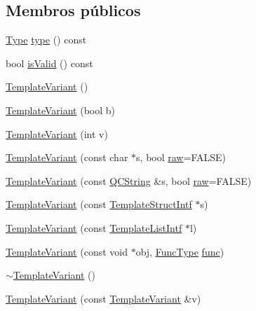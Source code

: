 \subsection*{Membros públicos}
\begin{DoxyCompactItemize}
\item 
\hyperlink{class_template_variant_a1d1cfd8ffb84e947f82999c682b666a7}{Type} \hyperlink{class_template_variant_abca1428e063147be90f3f5bd61988e84}{type} () const 
\item 
bool \hyperlink{class_template_variant_aac1b70a2ed67ead038c4d3f5ac4d8a81}{is\-Valid} () const 
\item 
\hyperlink{class_template_variant_ac0e47db8dd7250c313aa8df93ef88cd2}{Template\-Variant} ()
\item 
\hyperlink{class_template_variant_a13ff765310f43b911a2a9482df3ee834}{Template\-Variant} (bool b)
\item 
\hyperlink{class_template_variant_a8f05eae95886cc47c804212603c13cb2}{Template\-Variant} (int v)
\item 
\hyperlink{class_template_variant_a76ffcb0a0e88f62c0469c6568c685df3}{Template\-Variant} (const char $\ast$s, bool \hyperlink{class_template_variant_a4b1f81e659f9eb2d4964f1b3e55a32bb}{raw}=F\-A\-L\-S\-E)
\item 
\hyperlink{class_template_variant_a36208d2d2b65db39f94949efca59ad4e}{Template\-Variant} (const \hyperlink{class_q_c_string}{Q\-C\-String} \&s, bool \hyperlink{class_template_variant_a4b1f81e659f9eb2d4964f1b3e55a32bb}{raw}=F\-A\-L\-S\-E)
\item 
\hyperlink{class_template_variant_a87fc0fc43724dbcc478add94f6a06d15}{Template\-Variant} (const \hyperlink{class_template_struct_intf}{Template\-Struct\-Intf} $\ast$s)
\item 
\hyperlink{class_template_variant_aa00eac4f737f777af03d16c58339c79c}{Template\-Variant} (const \hyperlink{class_template_list_intf}{Template\-List\-Intf} $\ast$l)
\item 
\hyperlink{class_template_variant_a2a1090689531710f7b16823d5c3645c8}{Template\-Variant} (const void $\ast$obj, \hyperlink{class_template_variant_a9048747cd5dd98f5d42a53664324f7e4}{Func\-Type} \hyperlink{036__link_8c_affb6da6cff1b57cdf8efc0123dceac9b}{func})
\item 
\hyperlink{class_template_variant_a321443d11c4dd1f83bd1c742d0882467}{$\sim$\-Template\-Variant} ()
\item 
\hyperlink{class_template_variant_aa2b29e6460a4cc63c33e501caee84487}{Template\-Variant} (const \hyperlink{class_template_variant}{Template\-Variant} \&v)

\end{DoxyCompactItemize}
